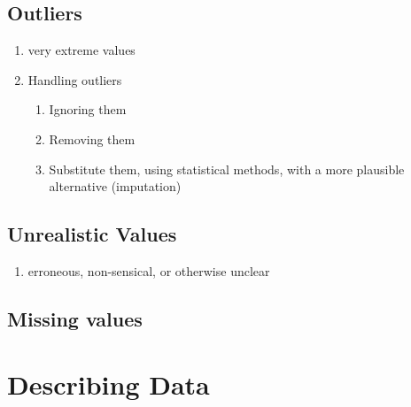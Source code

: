 \subsection{Outliers \cite{ism-1}}\label{outliers}
\begin{enumerate}
    \item very extreme values
    \item Handling outliers
    \begin{enumerate}
        \item Ignoring them
        \item Removing them
        \item Substitute them, using statistical methods, with a more plausible alternative (imputation)
    \end{enumerate}
\end{enumerate}

\subsection{Unrealistic Values \cite{ism-1}}\label{unrealistic_values}
\begin{enumerate}
    \item erroneous, non-sensical, or otherwise unclear
\end{enumerate}

\subsection{Missing values \cite{ism-1}}\label{missing_values}

\section{Describing Data \cite{ism-1}}

